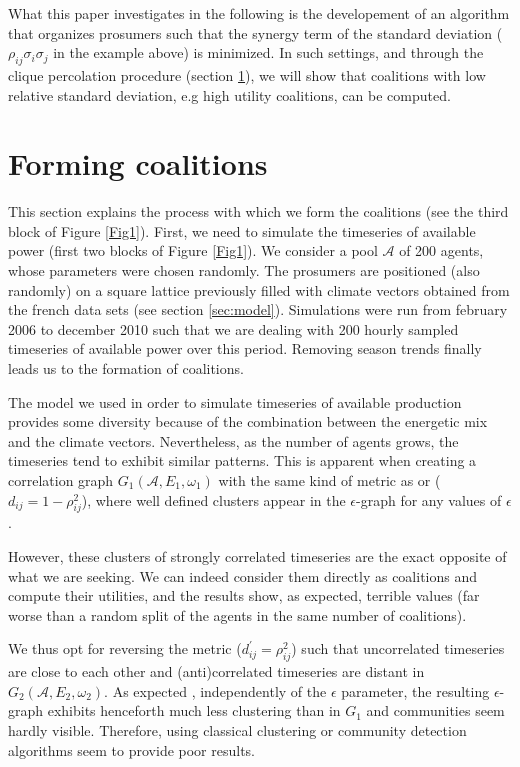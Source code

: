 \documentclass[conference]{IEEEtran}
\begin{document}
What this paper investigates in the following is the developement of an algorithm that organizes prosumers such that the synergy term of the standard deviation ( $ \rho_{ij}\sigma_{i}\sigma_{j} $ in the example above) is minimized. In such settings, and through the clique percolation procedure (section \ref{sec:forming}), we will show that coalitions with low relative standard deviation, e.g high utility coalitions, can be computed.

\section{Forming coalitions}
\label{sec:forming}

This section explains the process with which we form the coalitions (see the third block of Figure \ref{Fig1}). First, we need to simulate the timeseries of available power (first two blocks of Figure \ref{Fig1}). We consider a pool $ \mathcal{A} $ of 200 agents, whose parameters were chosen randomly. The prosumers are positioned (also randomly) on a square lattice previously filled with climate vectors obtained from the french data sets (see section \ref{sec:model}). Simulations were run from february 2006 to december 2010 such that we are dealing with 200 hourly sampled timeseries of available power over this period. Removing season trends finally leads us to the formation of coalitions. 

The model we used in order to simulate timeseries of available production provides some diversity because of the combination between the energetic mix and the climate vectors. Nevertheless, as the number of agents grows, the timeseries tend to exhibit similar patterns. This is apparent when creating a correlation graph $ G_{1}(\mathcal{A},E_{1},\omega_{1}) $ with the same kind of metric as \cite{Garas2008} or \cite{Onnela2004} ($ d_{ij} = 1 - \rho_{ij}^{2} $), where well defined clusters appear in the $ \epsilon $-graph for any values of $ \epsilon $. 

However, these clusters of strongly correlated timeseries are the exact opposite of what we are seeking. We can indeed consider them directly as coalitions and compute their utilities, and the results show, as expected, terrible values (far worse than a random split of the agents in the same number of coalitions).

We thus opt for reversing the metric ($ d_{ij}^{'} = \rho_{ij}^{2} $) such that uncorrelated timeseries are close to each other and (anti)correlated timeseries are distant in $ G_{2}(\mathcal{A},E_{2},\omega_{2}) $. As expected \cite{Onnela2004}, independently of the $ \epsilon $ parameter, the resulting $ \epsilon $-graph exhibits henceforth much less clustering than in $ G_{1} $ and communities seem hardly visible. Therefore, using classical clustering or community detection algorithms seem to provide poor results. 
\end{document}
